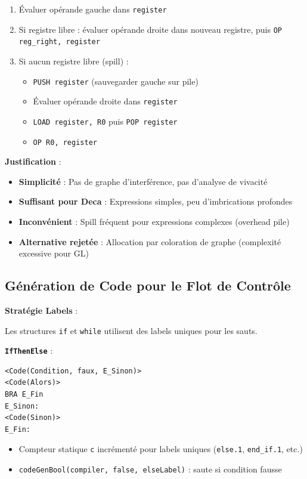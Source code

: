 \documentclass[12pt,a4paper]{article}
\begin{document}
\begin{enumerate}[itemsep=0.3em]
    \item Évaluer opérande gauche dans \texttt{register}
    \item Si registre libre : évaluer opérande droite dans nouveau registre, puis \texttt{OP reg\_right, register}
    \item Si aucun registre libre (spill) :
    \begin{itemize}
        \item \texttt{PUSH register} (sauvegarder gauche sur pile)
        \item Évaluer opérande droite dans \texttt{register}
        \item \texttt{LOAD register, R0} puis \texttt{POP register}
        \item \texttt{OP R0, register}
    \end{itemize}
\end{enumerate}

\textbf{Justification} :

\begin{itemize}[itemsep=0.2em]
    \item \textbf{Simplicité} : Pas de graphe d'interférence, pas d'analyse de vivacité
    \item \textbf{Suffisant pour Deca} : Expressions simples, peu d'imbrications profondes
    \item \textbf{Inconvénient} : Spill fréquent pour expressions complexes (overhead pile)
    \item \textbf{Alternative rejetée} : Allocation par coloration de graphe (complexité excessive pour GL)
\end{itemize}

\subsection{Génération de Code pour le Flot de Contrôle}

\textbf{Stratégie Labels} :

Les structures \texttt{if} et \texttt{while} utilisent des labels uniques pour les sauts.

\textbf{\texttt{IfThenElse}} :

\begin{lstlisting}[style=bashstyle, numbers=none]
<Code(Condition, faux, E_Sinon)>
<Code(Alors)>
BRA E_Fin
E_Sinon:
<Code(Sinon)>
E_Fin:
\end{lstlisting}

\begin{itemize}[itemsep=0.2em]
    \item Compteur statique \texttt{c} incrémenté pour labels uniques (\texttt{else.1}, \texttt{end\_if.1}, etc.)
    \item \texttt{codeGenBool(compiler, false, elseLabel)} : saute si condition fausse
\end{itemize}
\end{document}
